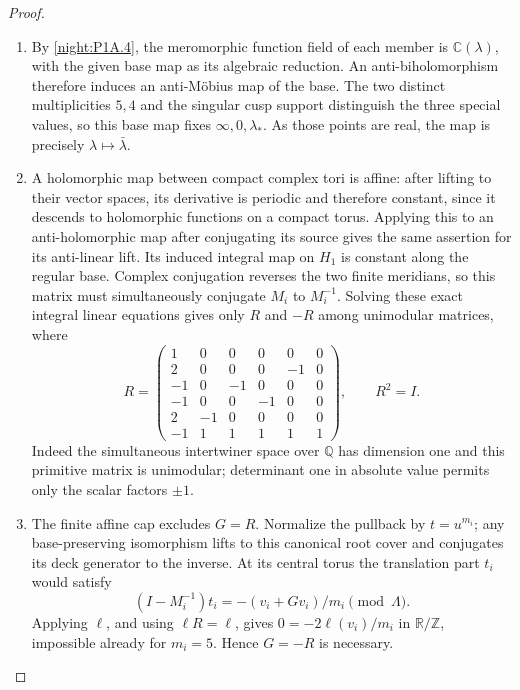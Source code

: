 \documentclass[11pt,a4paper]{article}
\numberwithin{equation}{section}
\theoremstyle{definition}
\begin{document}
\begin{proof}
\begin{enumerate}[label=\arabic*.]
\item By \cref{night:P1A.4}, the meromorphic function field of each
member is $\mathbb C(\lambda)$, with the given base map as its
algebraic reduction.  An anti-biholomorphism therefore induces an
anti-M\"obius map of the base.  The two distinct multiplicities $5,4$
and the singular cusp
support distinguish the three special values, so this base map fixes
$\infty,0,\lambda_*$.  As those points are real, the map is precisely
$\lambda\mapsto\bar\lambda$.

\item A holomorphic map between compact complex tori is affine: after
lifting to their vector spaces, its derivative is periodic and
therefore constant, since it descends to holomorphic functions on a
compact torus.  Applying this to an anti-holomorphic map after
conjugating its source gives the same assertion for its anti-linear
lift.  Its induced integral map on $H_1$ is constant along the
regular base.  Complex conjugation reverses the two finite meridians,
so this matrix must simultaneously conjugate $M_i$ to $M_i^{-1}$.
Solving these exact integral linear equations gives only $R$ and
$-R$ among unimodular matrices, where
\[
R=\begin{pmatrix}
1&0&0&0&0&0\\
2&0&0&0&-1&0\\
-1&0&-1&0&0&0\\
-1&0&0&-1&0&0\\
2&-1&0&0&0&0\\
-1&1&1&1&1&1
\end{pmatrix},\qquad R^2=I.
\]
Indeed the simultaneous intertwiner space over $\mathbb Q$ has
dimension one and this primitive matrix is unimodular; determinant
one in absolute value permits only the scalar factors $\pm1$.


\item The finite affine cap excludes $G=R$.  Normalize the pullback by
$t=u^{m_i}$; any base-preserving isomorphism lifts to this canonical
root cover and conjugates its deck generator to the inverse.
At its central torus the translation part $t_i$ would satisfy
\[
(I-M_i^{-1})t_i=-(v_i+Gv_i)/m_i\pmod\Lambda.
\]
Applying $\ell$, and using $\ell R=\ell$, gives
$0=-2\ell(v_i)/m_i$ in $\mathbb R/\mathbb Z$, impossible already
for $m_i=5$.  Hence $G=-R$ is necessary.


\end{enumerate}
\end{proof}
\end{document}
